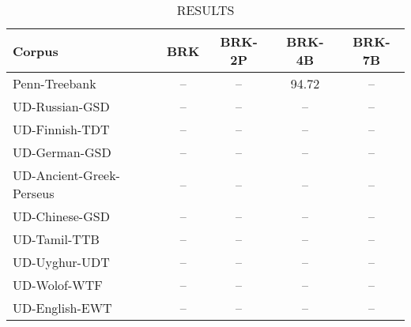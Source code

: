 \begin{table}[h]
\centering
\caption{RESULTS}
\label{tab:my_table}

\begin{tabular}{|l|c|c|c|c|}
\hline
\textbf{Corpus}                & \textbf{BRK} & \textbf{BRK-2P} & \textbf{BRK-4B} & \textbf{BRK-7B} \\ 
\hline
Penn-Treebank                  & --           & --              & 94.72           & --              \\
UD-Russian-GSD                 & --           & --              & --              & --              \\
UD-Finnish-TDT                 & --           & --              & --              & --              \\
UD-German-GSD                  & --           & --              & --              & --              \\
UD-Ancient-Greek-Perseus       & --           & --              & --              & --              \\
UD-Chinese-GSD                 & --           & --              & --              & --              \\
UD-Tamil-TTB                   & --           & --              & --              & --              \\
UD-Uyghur-UDT                  & --           & --              & --              & --              \\
UD-Wolof-WTF                   & --           & --              & --              & --              \\
UD-English-EWT                 & --           & --              & --              & --              \\
\hline

\end{tabular}
\end{table}